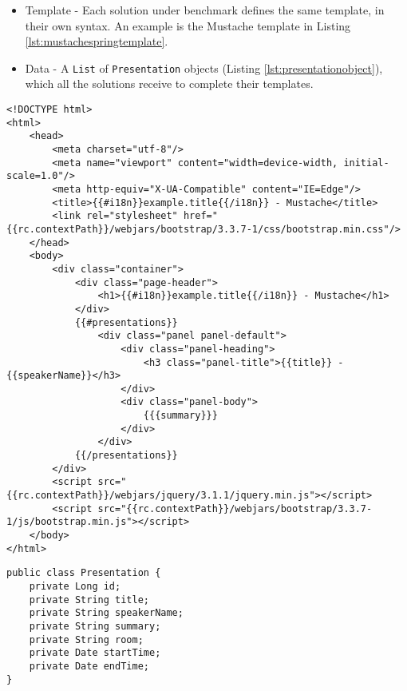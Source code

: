 \begin{itemize}
	\item Template - Each solution under benchmark defines the same template, in their own syntax. An example is the Mustache template in Listing \ref{lst:mustachespringtemplate}.
	\item Data - A \texttt{List} of \texttt{Presentation} objects (Listing \ref{lst:presentationobject}), which all the solutions receive to complete their templates.
\end{itemize}


\begin{minipage}{\linewidth}
\begin{lstlisting}[caption={Spring Benchmark Mustache Template},captionpos=b,label={lst:mustachespringtemplate}]
<!DOCTYPE html>
<html>
    <head>
        <meta charset="utf-8"/>
        <meta name="viewport" content="width=device-width, initial-scale=1.0"/>
        <meta http-equiv="X-UA-Compatible" content="IE=Edge"/>
        <title>{{#i18n}}example.title{{/i18n}} - Mustache</title>
        <link rel="stylesheet" href="{{rc.contextPath}}/webjars/bootstrap/3.3.7-1/css/bootstrap.min.css"/>
    </head>
    <body>
        <div class="container">
            <div class="page-header">
                <h1>{{#i18n}}example.title{{/i18n}} - Mustache</h1>
            </div>
            {{#presentations}}
                <div class="panel panel-default">
                    <div class="panel-heading">
                        <h3 class="panel-title">{{title}} - {{speakerName}}</h3>
                    </div>
                    <div class="panel-body">
                        {{{summary}}}
                    </div>
                </div>
            {{/presentations}}
        </div>
        <script src="{{rc.contextPath}}/webjars/jquery/3.1.1/jquery.min.js"></script>
        <script src="{{rc.contextPath}}/webjars/bootstrap/3.3.7-1/js/bootstrap.min.js"></script>
    </body>
</html>
\end{lstlisting}
\end{minipage}


\begin{minipage}{\linewidth}
\begin{lstlisting}[caption={Spring Benchmark Presentation Object},captionpos=b,label={lst:presentationobject}]
public class Presentation {
    private Long id;
    private String title;
    private String speakerName;
    private String summary;
    private String room;
    private Date startTime;
    private Date endTime;
}
\end{lstlisting}
\end{minipage}

